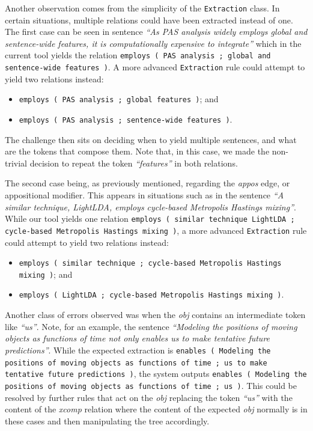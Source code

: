 \documentclass[11pt,a4paper,openright]{memoir}
\begin{document}
Another observation comes from the simplicity of the \texttt{Extraction} class. In certain situations, multiple relations could have been extracted instead of one. The first case can be seen in sentence \emph{\enquote{As PAS analysis widely employs global and sentence-wide features, it is computationally expensive to integrate}} which in the current tool yields the relation \texttt{employs	( PAS analysis ; global and sentence-wide features )}. A more advanced \texttt{Extraction} rule could attempt to yield two relations instead:
\begin{itemize}
	\item \texttt{employs	( PAS analysis ; global features )}; and
	\item \texttt{employs	( PAS analysis ; sentence-wide features )}.
\end{itemize}

The challenge then sits on deciding when to yield multiple sentences, and what are the tokens that compose them. Note that, in this case, we made the non-trivial decision to repeat the token \emph{\enquote{features}} in both relations.

The second case being, as previously mentioned, regarding the \emph{appos} edge, or appositional modifier. This appears in situations such as in the sentence \emph{\enquote{A similar technique, LightLDA, employs cycle-based Metropolis Hastings mixing}}. While our tool yields one relation \texttt{employs	( similar technique LightLDA ; cycle-based Metropolis Hastings mixing )}, a more advanced \texttt{Extraction} rule could attempt to yield two relations instead:
\begin{itemize}
	\item \texttt{employs	( similar technique ; cycle-based Metropolis Hastings mixing )}; and
	\item \texttt{employs	( LightLDA ; cycle-based Metropolis Hastings mixing )}.
\end{itemize}

Another class of errors observed was when the \emph{obj} contains an intermediate token like \emph{\enquote{us}}. Note, for an example, the sentence \emph{\enquote{Modeling the positions of moving objects as functions of time not only enables us to make tentative future predictions}}. While the expected extraction is \texttt{enables	( Modeling the positions of moving objects as functions of time ; us to make tentative future predictions )}, the system outputs \texttt{enables	( Modeling the positions of moving objects as functions of time ; us )}. This could be resolved by further rules that act on the \emph{obj} replacing the token \emph{\enquote{us}} with the content of the \emph{xcomp} relation where the content of the expected \emph{obj} normally is in these cases and then manipulating the tree accordingly.
\end{document}
